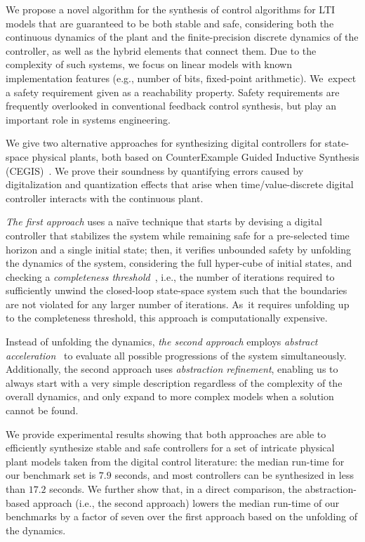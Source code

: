 \documentclass[runningheads,a4paper]{llncs}
\begin{document}
We propose a novel algorithm for the synthesis of control algorithms for LTI
models that are guaranteed to be both stable and safe, considering both the
continuous dynamics of the plant and the finite-precision discrete dynamics
of the controller, as well as the hybrid elements that connect them.
%
%
Due to the complexity of such systems, we focus on linear models with known
implementation features (e.g., number of bits, fixed-point arithmetic). 
We~expect a safety requirement given as a reachability property.  Safety
requirements are frequently overlooked in conventional feedback control
synthesis, but play an important role in systems engineering.

We give two alternative approaches for synthesizing digital controllers for
state-space physical plants, both based on CounterExample Guided Inductive
Synthesis (CEGIS)~\cite{sketch}.  We prove their soundness by quantifying
errors caused by digitalization and quantization effects that arise when
time/value-discrete digital controller interacts with the continuous plant.

{\em The first approach} uses a na\"ive technique that starts by devising a
digital controller that stabilizes the system while remaining safe for a
pre-selected time horizon and a single initial state; then, it verifies
unbounded safety by unfolding the dynamics of the system, considering the
full hyper-cube of initial states, and checking a {\em completeness
threshold}~\cite{DBLP:conf/vmcai/KroeningS03}, i.e., the number of
iterations required to sufficiently unwind the closed-loop state-space
system such that the boundaries are not violated for any larger number of
iterations.  As~it requires unfolding up to the completeness threshold, this
approach is computationally expensive.

Instead of unfolding the dynamics, {\em the second approach}
employs {\em abstract acceleration}~\cite{cattaruzza2015unbounded} to
evaluate all possible progressions of the system simultaneously. 
Additionally, the second approach uses {\em abstraction refinement},
enabling us to always start with a very simple description regardless of the
complexity of the overall dynamics, and only expand to more complex models
when a solution cannot be found.

We provide experimental results showing that both approaches are able to
efficiently synthesize stable and safe controllers for a set of intricate
physical plant models taken from the digital control literature: the median
run-time for our benchmark set is $7.9$ seconds, and most controllers can be
synthesized in less than $17.2$ seconds.  We further show that, in a direct
comparison, the abstraction-based approach (i.e., the second approach) lowers the median
run-time of our benchmarks by a factor of seven over the first approach
based on the unfolding of the dynamics.
\end{document}
